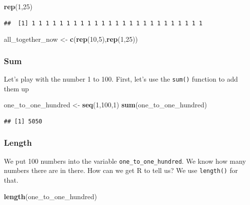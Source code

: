 \documentclass[]{book}
\newenvironment{Shaded}{\begin{snugshade}}{\end{snugshade}}
\newcommand{\KeywordTok}[1]{\textcolor[rgb]{0.13,0.29,0.53}{\textbf{#1}}}
\newcommand{\DecValTok}[1]{\textcolor[rgb]{0.00,0.00,0.81}{#1}}
\newcommand{\StringTok}[1]{\textcolor[rgb]{0.31,0.60,0.02}{#1}}
\newcommand{\NormalTok}[1]{#1}
\begin{document}
\begin{Shaded}
\begin{Highlighting}[]
\KeywordTok{rep}\NormalTok{(}\DecValTok{1}\NormalTok{,}\DecValTok{25}\NormalTok{)}
\end{Highlighting}
\end{Shaded}

\begin{verbatim}
##  [1] 1 1 1 1 1 1 1 1 1 1 1 1 1 1 1 1 1 1 1 1 1 1 1 1 1
\end{verbatim}

\begin{Shaded}
\begin{Highlighting}[]
\NormalTok{all_together_now <-}\StringTok{ }\KeywordTok{c}\NormalTok{(}\KeywordTok{rep}\NormalTok{(}\DecValTok{10}\NormalTok{,}\DecValTok{5}\NormalTok{),}\KeywordTok{rep}\NormalTok{(}\DecValTok{1}\NormalTok{,}\DecValTok{25}\NormalTok{)) }
\end{Highlighting}
\end{Shaded}

\subsubsection{Sum}\label{sum}

Let's play with the number 1 to 100. First, let's use the \texttt{sum()}
function to add them up

\begin{Shaded}
\begin{Highlighting}[]
\NormalTok{one_to_one_hundred <-}\StringTok{ }\KeywordTok{seq}\NormalTok{(}\DecValTok{1}\NormalTok{,}\DecValTok{100}\NormalTok{,}\DecValTok{1}\NormalTok{)}
\KeywordTok{sum}\NormalTok{(one_to_one_hundred)}
\end{Highlighting}
\end{Shaded}

\begin{verbatim}
## [1] 5050
\end{verbatim}

\subsubsection{Length}\label{length}

We put 100 numbers into the variable \texttt{one\_to\_one\_hundred}. We
know how many numbers there are in there. How can we get R to tell us?
We use \texttt{length()} for that.

\begin{Shaded}
\begin{Highlighting}[]
\KeywordTok{length}\NormalTok{(one_to_one_hundred)}
\end{Highlighting}
\end{Shaded}
\end{document}
